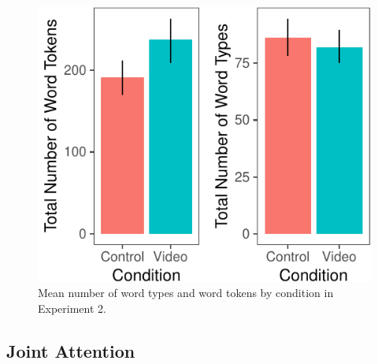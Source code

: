 \documentclass[10pt, letterpaper]{article}
\newenvironment{CodeChunk}{}{}
\begin{document}
\begin{CodeChunk}
\begin{figure}[H]

{\centering \includegraphics{figs/e2token-type-1} 

}

\caption[Mean number of word types and word tokens by condition in Experiment 2]{Mean number of word types and word tokens by condition in Experiment 2.}\label{fig:e2token-type}
\end{figure}
\end{CodeChunk}

\subsection{Joint Attention}\label{joint-attention-1}
\end{document}
